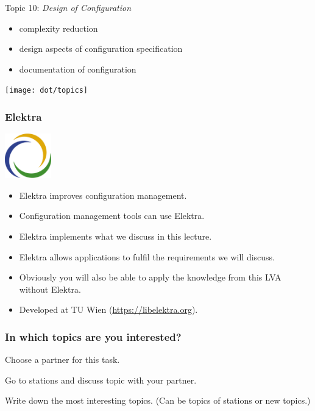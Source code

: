 \begin{frame}
	Topic 10: \textit{Design of Configuration}
	\begin{itemize}
		\item complexity reduction
		\item design aspects of configuration specification
		\item documentation of configuration
	\end{itemize}
\end{frame}


\begin{frame}
	\hspace*{-1cm}\texttt{[image: dot/topics]}
\end{frame}

\begin{frame}
	\frametitle{Elektra}
	\hfill \includegraphics[width=2cm]{../figures/logo}
	\vspace{-1cm}
	\begin{itemize}
		\item Elektra improves configuration management.
		\item Configuration management tools can use Elektra.
		\item Elektra implements what we discuss in this lecture.
		\item Elektra allows applications to fulfil the requirements we will discuss.
		\item Obviously you will also be able to apply the knowledge from this LVA without Elektra.
		\item Developed at TU Wien (\url{https://libelektra.org}).
	\end{itemize}
\end{frame}

\begin{assignment}
	\frametitle{In which topics are you interested?}
	\begin{task}[1]
	Choose a partner for this task.
	\end{task}

	\begin{task}[2]
	Go to stations and discuss topic with your partner.
	\end{task}

	\begin{task}[3]
	Write down the most interesting topics.
	(Can be topics of stations or new topics.)
	\end{task}
\end{assignment}





